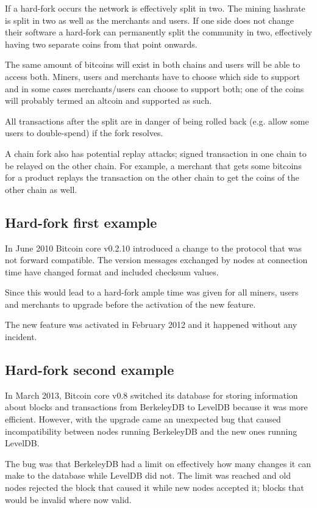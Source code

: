 If a hard-fork occurs the network is effectively split in two. The mining hashrate is split in two as well as the merchants and users. If one side does not change their software a hard-fork can permanently split the community in two, effectively having two separate coins from that point onwards.

The same amount of bitcoins will exist in both chains and users will be able to access both. Miners, users and merchants have to choose which side to support and in some cases merchants/users can choose to support both; one of the coins will probably termed an altcoin and supported as such.

All transactions after the split are in danger of being rolled back (e.g. allow some users to double-spend) if the fork resolves. 

A chain fork also has potential replay attacks; signed transaction in one chain to be relayed on the other chain. For example, a merchant that gets some bitcoins for a product replays the transaction on the other chain to get the coins of the other chain as well.

\subsection*{Hard-fork first example}
In June 2010 Bitcoin core v0.2.10 introduced a change to the protocol that was not forward compatible. The version messages exchanged by nodes at connection time have changed format and included checksum values.

Since this would lead to a hard-fork ample time was given for all miners, users and merchants to upgrade before the activation of the new feature.

The new feature was activated in February 2012 and it happened without any incident.

\subsection*{Hard-fork second example}
In March 2013, Bitcoin core v0.8 switched its database for storing information about blocks and transactions from BerkeleyDB to LevelDB because it was more efficient. However, with the upgrade came an unexpected bug that caused incompatibility between nodes running BerkeleyDB and the new ones running LevelDB.

The bug was that BerkeleyDB had a limit on effectively how many changes it can make to the database while LevelDB did not. The limit was reached and old nodes rejected the block that caused it while new nodes accepted it; blocks that would be invalid where now valid.


